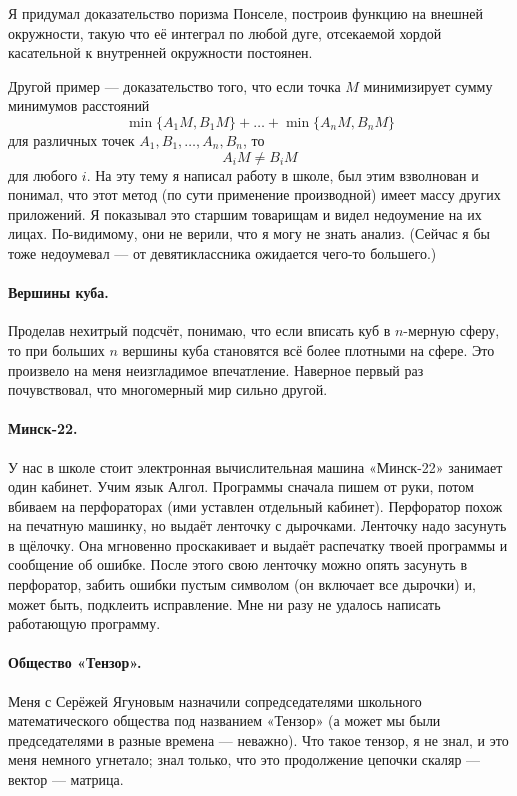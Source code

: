 \documentclass{book}
\begin{document}
Я придумал доказательство поризма Понселе, построив функцию на внешней окружности, такую что её интеграл по любой дуге, отсекаемой хордой касательной к внутренней окружности постоянен.

Другой пример --- доказательство того,
что если точка $M$ минимизирует сумму минимумов расстояний
\[\min\{A_1M,B_1M\}+\dots+\min\{A_nM,B_nM\}\]
для различных точек $A_1,B_1,\dots,A_n,B_n$, 
то
\[A_iM\ne B_iM\]
для любого $i$.
На эту тему я написал работу в школе, 
был этим взволнован и понимал, 
что этот метод (по сути применение производной) имеет массу других приложений.
Я показывал это старшим товарищам и видел недоумение на их лицах.
По-видимому, они не верили, что я могу не знать анализ.
(Сейчас я бы тоже недоумевал --- от девятиклассника ожидается чего-то большего.)

\paragraph{Вершины куба.}
Проделав нехитрый подсчёт, понимаю, что если вписать куб в $n$-мерную сферу, то при больших $n$ вершины куба становятся всё более плотными на сфере.
Это произвело на меня неизгладимое впечатление. 
Наверное первый раз почувствовал, что многомерный мир сильно другой.

\paragraph{Минск-22.} 
У нас в школе стоит электронная вычислительная машина «Минск-22»
занимает один кабинет.
Учим язык Алгол.
Программы сначала пишем от руки, потом вбиваем на перфораторах (ими уставлен отдельный кабинет).
Перфоратор похож на печатную машинку, но выдаёт ленточку с дырочками.
Ленточку надо засунуть в щёлочку. 
Она мгновенно проскакивает и выдаёт распечатку твоей программы и сообщение об ошибке.
После этого свою ленточку можно опять засунуть в перфоратор, забить ошибки пустым символом (он включает все дырочки) и, может быть, подклеить исправление.
Мне ни разу не удалось написать работающую программу.

\paragraph{Общество «Тензор».}
Меня с Серёжей Ягуновым назначили сопредседателями школьного математического общества под названием «Тензор» (а может мы были председателями в разные времена --- неважно).
Что такое тензор, я не знал, и это меня немного угнетало;
знал только, что это продолжение цепочки скаляр --- вектор --- матрица.
\end{document}
